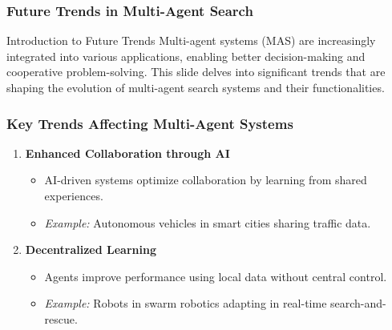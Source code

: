 \documentclass[aspectratio=169]{beamer}
\begin{document}
\begin{frame}[fragile]
    \frametitle{Future Trends in Multi-Agent Search}
    \begin{block}{Introduction to Future Trends}
        Multi-agent systems (MAS) are increasingly integrated into various applications, enabling better decision-making and cooperative problem-solving.
        This slide delves into significant trends that are shaping the evolution of multi-agent search systems and their functionalities.
    \end{block}
\end{frame}

\begin{frame}[fragile]
    \frametitle{Key Trends Affecting Multi-Agent Systems}
    \begin{enumerate}
        \item \textbf{Enhanced Collaboration through AI}
        \begin{itemize}
            \item AI-driven systems optimize collaboration by learning from shared experiences.
            \item \textit{Example:} Autonomous vehicles in smart cities sharing traffic data.
        \end{itemize}
        
        \item \textbf{Decentralized Learning}
        \begin{itemize}
            \item Agents improve performance using local data without central control.
            \item \textit{Example:} Robots in swarm robotics adapting in real-time search-and-rescue.
        \end{itemize}
    \end{enumerate}
\end{frame}
\end{document}
